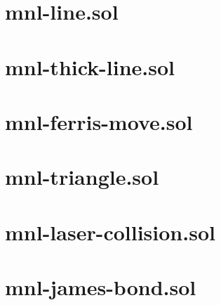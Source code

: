 \section{mnl-line.sol}


\section{mnl-thick-line.sol}


\section{mnl-ferris-move.sol}


\section{mnl-triangle.sol}


\section{mnl-laser-collision.sol}


\section{mnl-james-bond.sol}


